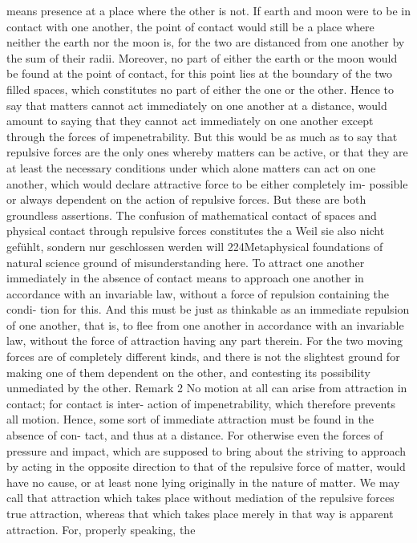 means presence at a place where the other is not. If earth and moon were
to be in contact with one another, the point of contact would still be a
place where neither the earth nor the moon is, for the two are distanced
from one another by the sum of their radii. Moreover, no part of either
the earth or the moon would be found at the point of contact, for this
point lies at the boundary of the two ﬁlled spaces, which constitutes no
part of either the one or the other. Hence to say that matters cannot act
immediately on one another at a distance, would amount to saying that
they cannot act immediately on one another except through the forces of
impenetrability. But this would be as much as to say that repulsive forces
are the only ones whereby matters can be active, or that they are at
least the necessary conditions under which alone matters can act on one
another, which would declare attractive force to be either completely im-
possible or always dependent on the action of repulsive forces. But these
are both groundless assertions. The confusion of mathematical contact
of spaces and physical contact through repulsive forces constitutes the
a
Weil sie also nicht gefühlt, sondern nur geschlossen werden will
224Metaphysical foundations of natural science
ground of misunderstanding here. To attract one another immediately
in the absence of contact means to approach one another in accordance
with an invariable law, without a force of repulsion containing the condi-
tion for this. And this must be just as thinkable as an immediate repulsion
of one another, that is, to ﬂee from one another in accordance with an
invariable law, without the force of attraction having any part therein.
For the two moving forces are of completely different kinds, and there
is not the slightest ground for making one of them dependent on the
other, and contesting its possibility unmediated by the other.
Remark 2
No motion at all can arise from attraction in contact; for contact is inter-
action of impenetrability, which therefore prevents all motion. Hence,
some sort of immediate attraction must be found in the absence of con-
tact, and thus at a distance. For otherwise even the forces of pressure and
impact, which are supposed to bring about the striving to approach by
acting in the opposite direction to that of the repulsive force of matter,
would have no cause, or at least none lying originally in the nature of
matter. We may call that attraction which takes place without mediation
of the repulsive forces true attraction, whereas that which takes place
merely in that way is apparent attraction. For, properly speaking, the
